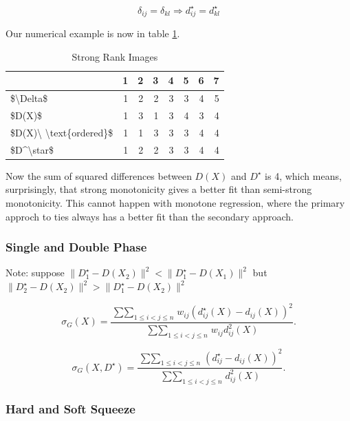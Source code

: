 \documentclass[
  12pt,
]{book}
\theoremstyle{definition}
\theoremstyle{definition}
\theoremstyle{definition}
\theoremstyle{definition}
\theoremstyle{remark}
\begin{document}
\begin{equation}
\delta_{ij}=\delta_{kl}\Rightarrow d_{ij}^\star=d_{kl}^\star
\label{eq:nmrankimage2}
\end{equation}

Our numerical example is now in table \ref{tab:nmriexample2}.

\begin{table}

\caption{\label{tab:nmriexample2}Strong Rank Images}
\centering
\begin{tabular}[t]{l|r|r|r|r|r|r|r}
\hline
  & 1 & 2 & 3 & 4 & 5 & 6 & 7\\
\hline
\$\textbackslash{}Delta\$ & 1 & 2 & 2 & 3 & 3 & 4 & 5\\
\hline
\$D(X)\$ & 1 & 3 & 1 & 3 & 4 & 3 & 4\\
\hline
\$D(X)\textbackslash{} \textbackslash{}text\{ordered\}\$ & 1 & 1 & 3 & 3 & 3 & 4 & 4\\
\hline
\$D\textasciicircum{}\textbackslash{}star\$ & 1 & 2 & 2 & 3 & 3 & 4 & 4\\
\hline
\end{tabular}
\end{table}

Now the sum of squared differences between \(D(X)\) and \(D^\star\) is 4, which
means, surprisingly, that strong monotonicity gives a better fit than semi-strong monotonicity. This cannot happen with monotone regression, where the primary approch to ties always has a better fit than the secondary approach.

\hypertarget{single-and-double-phase}{%
\subsubsection{Single and Double Phase}\label{single-and-double-phase}}

Note: suppose \(\|D_1^\star-D(X_2)\|^2<\|D_1^\star-D(X_1)\|^2\) but
\(\|D_2^\star-D(X_2)\|^2>\|D_1^\star-D(X_2)\|^2\)

\[
\sigma_G(X)=\frac{\mathop{\sum\sum}_{1\leq i<j\leq n}w_{ij}(d^\star_{ij}(X)-d_{ij}(X))^2}{\mathop{\sum\sum}_{1\leq i<j\leq n}w_{ij}d_{ij}^2(X)}.
\]

\[
\sigma_G(X,D^\star)=\frac{\mathop{\sum\sum}_{1\leq i<j\leq n}(d^\star_{ij}-d_{ij}(X))^2}{\mathop{\sum\sum}_{1\leq i<j\leq n}d_{ij}^2(X)}.
\]

\hypertarget{hard-and-soft-squeeze}{%
\subsubsection{Hard and Soft Squeeze}\label{hard-and-soft-squeeze}}
\end{document}
